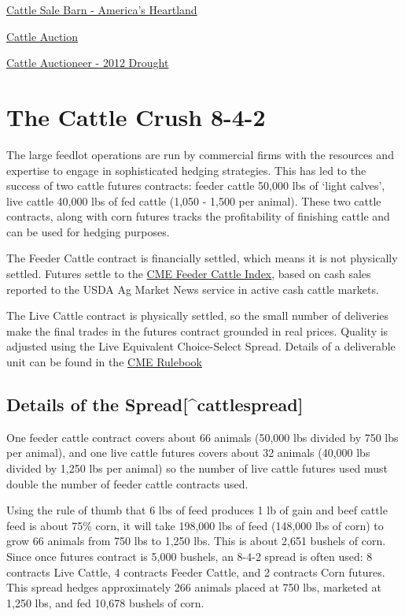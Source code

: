 \documentclass[
  letterpaper,
  DIV=11,
  numbers=noendperiod]{scrreprt}
\begin{document}
\href{https://www.youtube.com/watch?v=m0iiTk3MQ3k}{Cattle Sale Barn -
America's Heartland}

\href{https://www.youtube.com/watch?v=ACKT5jWJHTI}{Cattle Auction}

\href{https://www.youtube.com/watch?v=Ig514nyWQho}{Cattle Auctioneer -
2012 Drought}

\hypertarget{the-cattle-crush-8-4-2}{%
\section{The Cattle Crush 8-4-2}\label{the-cattle-crush-8-4-2}}

The large feedlot operations are run by commercial firms with the
resources and expertise to engage in sophisticated hedging strategies.
This has led to the success of two cattle futures contracts: feeder
cattle 50,000 lbs of `light calves', live cattle 40,000 lbs of fed
cattle (1,050 - 1,500 per animal). These two cattle contracts, along
with corn futures tracks the profitability of finishing cattle and can
be used for hedging purposes.

The Feeder Cattle contract is financially settled, which means it is not
physically settled. Futures settle to the
\href{http://www.cmegroup.com/market-data/reports/cash-settled-commodity-index-prices.html}{CME
Feeder Cattle Index}, based on cash sales reported to the USDA Ag Market
News service in active cash cattle markets.

The Live Cattle contract is physically settled, so the small number of
deliveries make the final trades in the futures contract grounded in
real prices. Quality is adjusted using the Live Equivalent Choice-Select
Spread. Details of a deliverable unit can be found in the
\href{http://www.cmegroup.com/rulebook/CME/II/100/101/101.pdf}{CME
Rulebook}

\hypertarget{details-of-the-spreadcattlespread}{%
\subsection{Details of the
Spread{[}\^{}cattlespread{]}}\label{details-of-the-spreadcattlespread}}

One feeder cattle contract covers about 66 animals (50,000 lbs divided
by 750 lbs per animal), and one live cattle futures covers about 32
animals (40,000 lbs divided by 1,250 lbs per animal) so the number of
live cattle futures used must double the number of feeder cattle
contracts used.

Using the rule of thumb that 6 lbs of feed produces 1 lb of gain and
beef cattle feed is about 75\% corn, it will take 198,000 lbs of feed
(148,000 lbs of corn) to grow 66 animals from 750 lbs to 1,250 lbs. This
is about 2,651 bushels of corn. Since once futures contract is 5,000
bushels, an 8-4-2 spread is often used: 8 contracts Live Cattle, 4
contracts Feeder Cattle, and 2 contracts Corn futures. This spread
hedges approximately 266 animals placed at 750 lbs, marketed at 1,250
lbs, and fed 10,678 bushels of corn.
\end{document}
